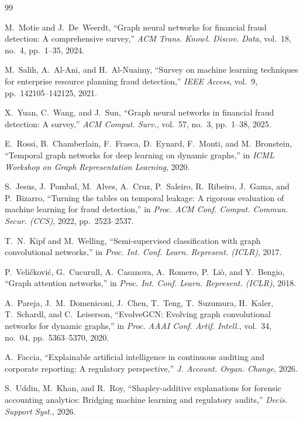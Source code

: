 \documentclass[journal]{IEEEtran}
\begin{document}
\begin{thebibliography}{99}

M.~Motie and J.~De~Weerdt, ``Graph neural networks for financial fraud detection: A comprehensive survey,'' \emph{ACM Trans. Knowl. Discov. Data}, vol.~18, no.~4, pp.~1--35, 2024.

M.~Salih, A.~Al-Ani, and H.~Al-Nuaimy, ``Survey on machine learning techniques for enterprise resource planning fraud detection,'' \emph{IEEE Access}, vol.~9, pp.~142105--142125, 2021.

X.~Yuan, C.~Wang, and J.~Sun, ``Graph neural networks in financial fraud detection: A survey,'' \emph{ACM Comput. Surv.}, vol.~57, no.~3, pp.~1--38, 2025.

E.~Rossi, B.~Chamberlain, F.~Frasca, D.~Eynard, F.~Monti, and M.~Bronstein, ``Temporal graph networks for deep learning on dynamic graphs,'' in \emph{ICML Workshop on Graph Representation Learning}, 2020.

S.~Jesus, J.~Pombal, M.~Alves, A.~Cruz, P.~Saleiro, R.~Ribeiro, J.~Gama, and P.~Bizarro, ``Turning the tables on temporal leakage: A rigorous evaluation of machine learning for fraud detection,'' in \emph{Proc. ACM Conf. Comput. Commun. Secur. (CCS)}, 2022, pp.~2523--2537.

T.~N.~Kipf and M.~Welling, ``Semi-supervised classification with graph convolutional networks,'' in \emph{Proc. Int. Conf. Learn. Represent. (ICLR)}, 2017.

P.~Veli\v{c}kovi\'c, G.~Cucurull, A.~Casanova, A.~Romero, P.~Li\`o, and Y.~Bengio, ``Graph attention networks,'' in \emph{Proc. Int. Conf. Learn. Represent. (ICLR)}, 2018.

A.~Pareja, J.~M.~Domeniconi, J.~Chen, T.~Teng, T.~Suzumura, H.~Kaler, T.~Schardl, and C.~Leiserson, ``EvolveGCN: Evolving graph convolutional networks for dynamic graphs,'' in \emph{Proc. AAAI Conf. Artif. Intell.}, vol.~34, no.~04, pp.~5363--5370, 2020.

A.~Faccia, ``Explainable artificial intelligence in continuous auditing and corporate reporting: A regulatory perspective,'' \emph{J. Account. Organ. Change}, 2026.

S.~Uddin, M.~Khan, and R.~Roy, ``Shapley-additive explanations for forensic accounting analytics: Bridging machine learning and regulatory audits,'' \emph{Decis. Support Syst.}, 2026.


\end{thebibliography}
\end{document}
